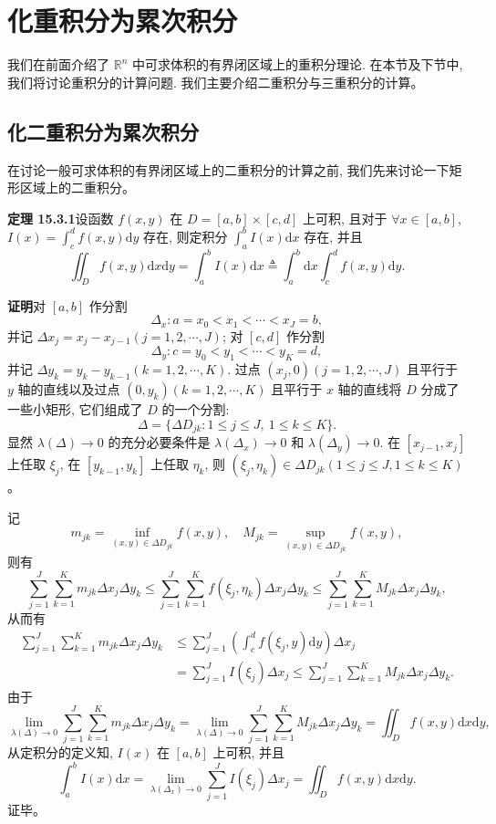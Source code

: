 \documentclass[UTF8, 12pt, fontset=fandol, oneside]{ctexart}
\begin{document}
\section{化重积分为累次积分}

我们在前面介绍了 $\mathbb R^n$ 中可求体积的有界闭区域上的重积分理论. 在本节及下节中, 我们将讨论重积分的计算问题. 我们主要介绍二重积分与三重积分的计算。

\subsection{化二重积分为累次积分}

在讨论一般可求体积的有界闭区域上的二重积分的计算之前, 我们先来讨论一下矩形区域上的二重积分。

\noindent\textbf{定理 15.3.1}\quad 设函数 $f(x,y)$ 在 $D=[a,b]\times[c,d]$ 上可积, 且对于 $\forall x\in[a,b]$, $I(x)=\int_c^d f(x,y)\mathrm dy$ 存在, 则定积分 $\int_a^b I(x)\mathrm dx$ 存在, 并且
\[
  \iint_D f(x,y)\mathrm dx\mathrm dy
  =\int_a^b I(x)\mathrm dx
  \triangleq\int_a^b\mathrm dx\int_c^d f(x,y)\mathrm dy.
\]

\noindent\textbf{证明}\quad 对 $[a,b]$ 作分割
\[
  \Delta_x:a=x_0<x_1<\cdots<x_J=b,
\]
并记 $\Delta x_j=x_j-x_{j-1}(j=1,2,\cdots,J)$; 对 $[c,d]$ 作分割
\[
  \Delta_y:c=y_0<y_1<\cdots<y_K=d,
\]
并记 $\Delta y_k=y_k-y_{k-1}(k=1,2,\cdots,K)$. 过点 $(x_j,0)(j=1,2,\cdots,J)$ 且平行于 $y$ 轴的直线以及过点 $(0,y_k)(k=1,2,\cdots,K)$ 且平行于 $x$ 轴的直线将 $D$ 分成了一些小矩形, 它们组成了 $D$ 的一个分割:
\[
  \Delta=\{\Delta D_{jk}:1\leqslant j\leqslant J,\ 1\leqslant k\leqslant K\}.
\]
显然 $\lambda(\Delta)\to0$ 的充分必要条件是 $\lambda(\Delta_x)\to0$ 和 $\lambda(\Delta_y)\to0$. 在 $[x_{j-1},x_j]$ 上任取 $\xi_j$, 在 $[y_{k-1},y_k]$ 上任取 $\eta_k$, 则 $(\xi_j,\eta_k)\in\Delta D_{jk}(1\leqslant j\leqslant J,1\leqslant k\leqslant K)$。

记
\[
  m_{jk}=\inf_{(x,y)\in\Delta D_{jk}}f(x,y),\quad
  M_{jk}=\sup_{(x,y)\in\Delta D_{jk}}f(x,y),
\]
则有
\[
  \sum_{j=1}^J\sum_{k=1}^K m_{jk}\Delta x_j\Delta y_k
  \leqslant \sum_{j=1}^J\sum_{k=1}^K f(\xi_j,\eta_k)\Delta x_j\Delta y_k
  \leqslant \sum_{j=1}^J\sum_{k=1}^K M_{jk}\Delta x_j\Delta y_k,
\]
从而有
\[
\begin{aligned}
  \sum_{j=1}^J\sum_{k=1}^K m_{jk}\Delta x_j\Delta y_k
  &\leqslant \sum_{j=1}^J\left(\int_c^d f(\xi_j,y)\mathrm dy\right)\Delta x_j\\
  &=\sum_{j=1}^J I(\xi_j)\Delta x_j
  \leqslant \sum_{j=1}^J\sum_{k=1}^K M_{jk}\Delta x_j\Delta y_k.
\end{aligned}
\]
由于
\[
  \lim_{\lambda(\Delta)\to0}\sum_{j=1}^J\sum_{k=1}^K m_{jk}\Delta x_j\Delta y_k
  =
  \lim_{\lambda(\Delta)\to0}\sum_{j=1}^J\sum_{k=1}^K M_{jk}\Delta x_j\Delta y_k
  =
  \iint_D f(x,y)\mathrm dx\mathrm dy,
\]
从定积分的定义知, $I(x)$ 在 $[a,b]$ 上可积, 并且
\[
  \int_a^b I(x)\mathrm dx
  =
  \lim_{\lambda(\Delta_x)\to0}\sum_{j=1}^J I(\xi_j)\Delta x_j
  =
  \iint_D f(x,y)\mathrm dx\mathrm dy.
\]
证毕。
\end{document}
